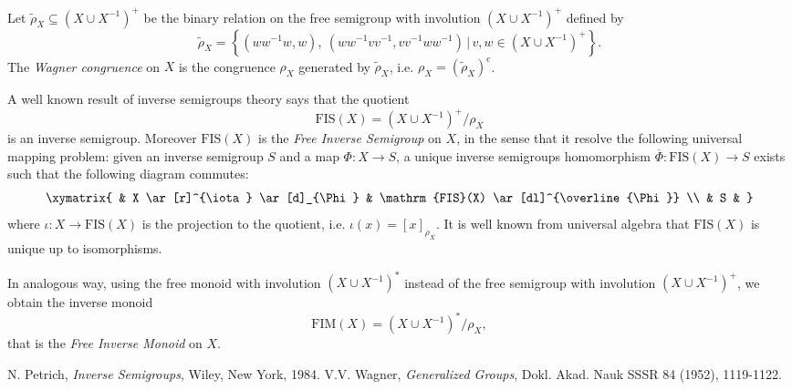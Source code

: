 \documentclass[12pt]{article}
\begin{document}
\newcommand{\e}{\mathrm{e}}
\newcommand{\co}{\mathrm{c}}

\newcommand{\cbra}[1]{\left( #1 \right)}
\newcommand{\qbra}[1]{\left[ #1 \right]}
\newcommand{\gbra}[1]{\left\{ #1 \right\}}
\newcommand{\abra}[1]{\left\langle #1 \right\rangle}

\newcommand{\mipres}[2]{\mathrm{Inv}^1\abra{#1 | #2}}
\newcommand{\sipres}[2]{\mathrm{Inv}\abra{#1 | #2}}

\newcommand{\double}[1]{\cbra{#1\cup #1^{-1}}}
\newcommand{\doubles}[1]{\cbra{#1\cup #1^{-1}}^\ast}
\newcommand{\doublep}[1]{\cbra{#1\cup #1^{-1}}^+}
\newcommand{\fim}{\mathrm{FIM}}
\newcommand{\fis}{\mathrm{FIS}}

Let $\tilde\rho_X\subseteq\doublep{X}$ be the binary relation on the free semigroup with involution $\doublep X$ defined by $$\tilde\rho_X=\gbra{(ww^{-1}w,w),\ (ww^{-1}vv^{-1},vv^{-1}ww^{-1})\,|\,v,w\in\doublep{X}}.$$
The \emph{Wagner congruence} on $X$ is the congruence $\rho_X$ generated by $\tilde\rho_X$, i.e. $\rho_X=(\tilde\rho_X)^\co$.

A well known result of inverse semigroups theory says that the quotient $$\fis(X)=\doublep{X}/\rho_X$$ is an inverse semigroup. Moreover $\fis(X)$ is the \emph{Free Inverse Semigroup} on $X$, in the sense that it resolve the following universal mapping problem: given an inverse semigroup $S$ and a map $\Phi:X\rightarrow S$, a unique inverse semigroups homomorphism $\overline\Phi:\fis(X)\rightarrow S$ exists such that the following diagram commutes:
$$
\xymatrix{
& X \ar[r]^{\iota} \ar[d]_{\Phi} & \fis(X) \ar[dl]^{\overline{\Phi}} \\
& S & 
}
$$
where $\iota:X\rightarrow\fis(X)$ is the projection to the quotient, i.e. $\iota(x)=[x]_{\rho_X}$. It is well known from universal algebra that $\fis(X)$ is unique up to isomorphisms.

In  analogous way, using the free monoid with involution $\doubles{X}$ instead of the free semigroup with involution $\doublep{X}$, we obtain the inverse monoid $$\fim(X)=\doubles{X}/\rho_X,$$ that is the  \emph{Free Inverse Monoid} on $X$.


\begin{thebibliography}{9}
 N. Petrich, \emph{Inverse Semigroups}, Wiley, New York, 1984.
 V.V. Wagner, \emph{Generalized Groups}, Dokl. Akad. Nauk SSSR 84 (1952), 1119-1122.
\end{thebibliography}
\end{document}
